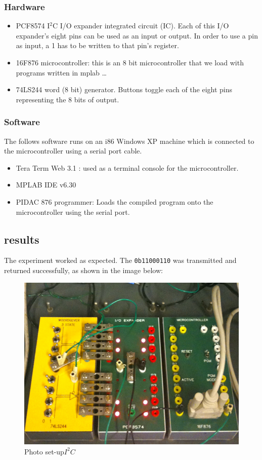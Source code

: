 \documentclass[a4paper, 12pt, titlepage]{article}
\begin{document}
\subsubsection{Hardware}

\begin{itemize}
\item PCF8574 I$^2$C I/O expander integrated circuit (IC).
Each of this I/O expander's eight pins can be used as an input or output. In order 
to use a pin as input, a 1 has to be written to that pin's register.
\item 16F876 microcontroller: this is an 8 bit microcontroller that we load with
programs written in mplab \dots
\item 74LS244 word (8 bit) generator. Buttons toggle each of the eight pins
representing the 8 bits of output.
\end{itemize}

\subsubsection{Software}
The follows software runs on an i86 Windows XP machine which is connected to the
microcontroller using a serial port cable.
\begin{itemize}
\item Tera Term Web 3.1 : used as a terminal console for the microcontroller.
\item MPLAB IDE v6.30
\item PIDAC 876 programmer: Loads the compiled program onto the microcontroller
using the serial port.
\end{itemize}



\subsection{results} %
The experiment worked as expected. The \texttt{0b11000110} was transmitted and
returned successfully, as shown in the image below:
\begin{figure}[H]
\caption{Photo set-up$I^{2}C$}
\includegraphics[scale=0.61]{IMG_0703}
\end{figure}
\end{document}
